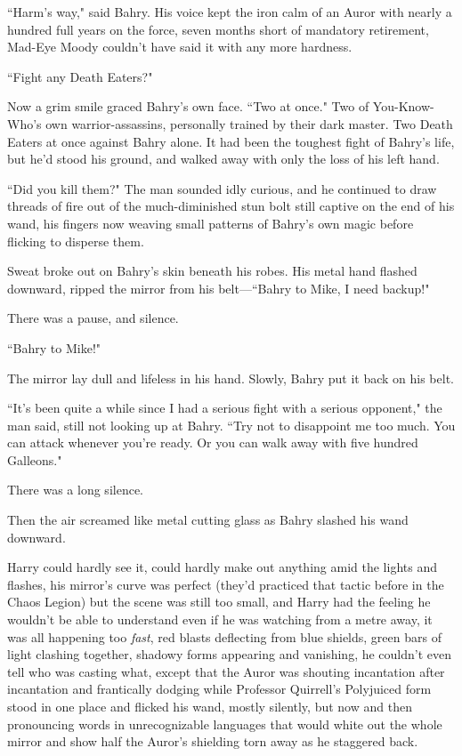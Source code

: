 ``Harm's way," said Bahry. His voice kept the iron calm of an Auror with nearly a hundred full years on the force, seven months short of mandatory retirement, Mad-Eye Moody couldn't have said it with any more hardness.

``Fight any Death Eaters?"

Now a grim smile graced Bahry's own face. ``Two at once." Two of You-Know-Who's own warrior-assassins, personally trained by their dark master. Two Death Eaters at once against Bahry alone. It had been the toughest fight of Bahry's life, but he'd stood his ground, and walked away with only the loss of his left hand.

``Did you kill them?" The man sounded idly curious, and he continued to draw threads of fire out of the much-diminished stun bolt still captive on the end of his wand, his fingers now weaving small patterns of Bahry's own magic before flicking to disperse them.

Sweat broke out on Bahry's skin beneath his robes. His metal hand flashed downward, ripped the mirror from his belt—``Bahry to Mike, I need backup!"

There was a pause, and silence.

``Bahry to Mike!"

The mirror lay dull and lifeless in his hand. Slowly, Bahry put it back on his belt.

``It's been quite a while since I had a serious fight with a serious opponent," the man said, still not looking up at Bahry. ``Try not to disappoint me too much. You can attack whenever you're ready. Or you can walk away with five hundred Galleons."

There was a long silence.

Then the air screamed like metal cutting glass as Bahry slashed his wand downward.

\later

Harry could hardly see it, could hardly make out anything amid the lights and flashes, his mirror's curve was perfect (they'd practiced that tactic before in the Chaos Legion) but the scene was still too small, and Harry had the feeling he wouldn't be able to understand even if he was watching from a metre away, it was all happening too \emph{fast}, red blasts deflecting from blue shields, green bars of light clashing together, shadowy forms appearing and vanishing, he couldn't even tell who was casting what, except that the Auror was shouting incantation after incantation and frantically dodging while Professor Quirrell's Polyjuiced form stood in one place and flicked his wand, mostly silently, but now and then pronouncing words in unrecognizable languages that would white out the whole mirror and show half the Auror's shielding torn away as he staggered back.

